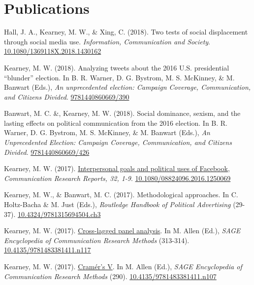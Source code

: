\section{Publications}
\begin{bibenum}
\item Hall, J. A., Kearney, M. W., \& Xing, C. (2018).
Two tests of social displacement through social media use.
\textit{Information, Communication and Society}.
\href{https://doi.org/10.1080/1369118X.2018.1430162}{10.1080/1369118X.2018.1430162}

\item Kearney, M. W. (2018).
Analyzing tweets about the 2016 U.S. presidential ``blunder'' election.
In B. R. Warner, D. G. Bystrom, M. S. McKinney, \& M. Banwart (Eds.),
\textit{An unprecedented election: Campaign Coverage, Communication, and Citizens Divided}.
\href{http://publisher.abc-clio.com/9781440860669/390}{9781440860669/390}

\item Banwart, M. C. \&, Kearney, M. W. (2018).
Social dominance, sexism, and the lasting effects on political communication from the 2016 election. In B. R. Warner,
D. G. Bystrom, M. S. McKinney, \& M. Banwart (Eds.),
\textit{An Unprecedented Election: Campaign Coverage, Communication, and Citizens Divided}.
\href{http://publisher.abc-clio.com/9781440860669/426}{9781440860669/426}

\item Kearney, M. W. (2017).
\href{http://www.tandfonline.com/doi/abs/10.1080/08824096.2016.1250069}{Interpersonal goals and political uses of Facebook},
\textit{Communication Research Reports, 32, 1-9}.
\href{https://doi.org/10.1080/08824096.2016.1250069}{10.1080/08824096.2016.1250069}

\item[] Kearney, M. W., \& Banwart, M. C. (2017).
Methodological approaches.
In C. Holtz-Bacha \& M. Just (Eds.), \textit{Routledge Handbook of Political Advertising} (29-37).
\href{https://www.routledgehandbooks.com/doi/10.4324/9781315694504.ch3}{10.4324/9781315694504.ch3}

\item[] Kearney, M. W. (2017).
\href{http://mikewk.com/clpm.pdf}{Cross-lagged panel analysis}.
In M. Allen (Ed.), \textit{SAGE Encyclopedia of Communication Research Methods} (313-314).
\href{http://dx.doi.org/10.4135/9781483381411.n117}{10.4135/9781483381411.n117}

\item[] Kearney, M. W. (2017).
\href{http://mikewk.com/cramersv.pdf}{Cram\'{e}r's V}.
In M. Allen (Ed.), \textit{SAGE Encyclopedia of Communication Research Methods} (290).
\href{http://dx.doi.org/10.4135/9781483381411.n107}{10.4135/9781483381411.n107}


\end{bibenum}
